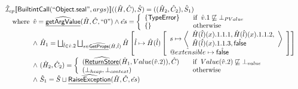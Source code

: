 \[
\begin{array}{ll}

\aI _{cp}\lbr \SF{BuiltintCall}(``\SF{Object.seal}",args)\rbr((\hat{H},\hat{C}), \hat{S})
  = ((\hat{H}_2, \hat{C}_2), \hat{S}_1)\\
\quad\wherec{
 \hat{v} =\ahf{getArgValue}(\hat{H}, \hat{C}, ``0")
  \land \hat{es} =
    \left\{
    \begin{array}{l@{\quad\quad}l}
      \{ \SF{TypeError} \} & \ifc{\hat{v}.1 \not\sqsubseteq \bot_{PValue}}\\
      \{ \}& \owc\\
    \end{array}
    \right.\\
  \land\ \hat{H}_1 = \bigsqcup_{\hat{l} \in \hat{v}.2}
    \bigsqcup_{s \in \ahf{GetProps}(\hat{H}, \hat{l})} \hat{H}
    \left[\hat{l} \mapsto \hat{H}(\hat{l})
      \left[\begin{array}{l}
        s \mapsto 
        \left\langle\begin{array}{l}
          \hat{H}(\hat{l})(x).1.1.1, \hat{H}(\hat{l})(x).1.1.2,\\
          \hat{H}(\hat{l})(x).1.1.3,\afalse 
        \end{array}\right\rangle\\
      \avarprop{extensible} \mapsto \afalse
      \end{array}\right]\right]\\
  \land\ (\hat{H}_2, \hat{C}_2) = 
    \left\{\begin{array}{l@{\quad\quad}l}
      (\ahf{ReturnStore}(\hat{H}_1, Value(\hat{v}.2)), \hat{C})
      & \ifc{Value(\hat{v}.2) \not\sqsubseteq \bot_{value}}\\
      (\bot_{heap}, \bot_{context}) & \owc \\
    \end{array}\right.\\
  \land\ \hat{S}_1 = \hat{S} \sqcup \ahf{RaiseException}(\hat{H}, \hat{C}, \hat{es})\\
  }\\
\\\\ 



\end{array}\]
